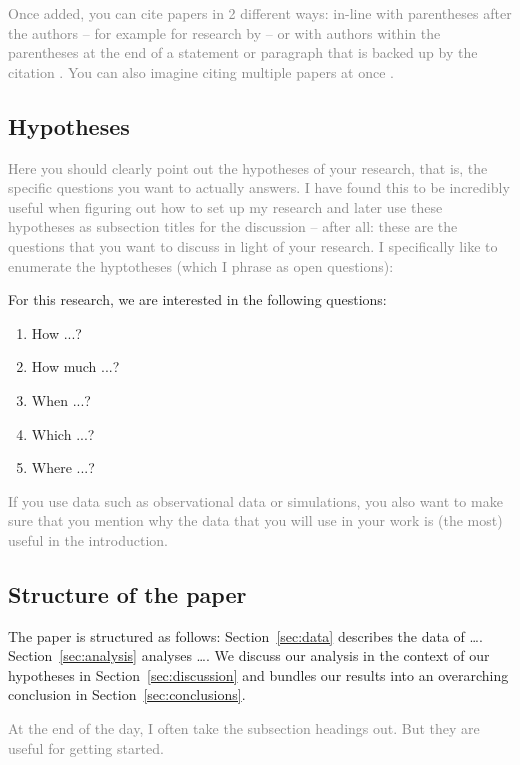 \documentclass[
  journal=pasa,
  manuscript=Research-Article,
  year=2025,
  volume=X,
]{cup-journal}
\newcommand{\comment}[1]{\textcolor{gray}{#1}}
\begin{document}
\comment{Once added, you can cite papers in 2 different ways: in-line with parentheses after the authors -- for example for research by \citet{Buder2024b} -- or with authors within the parentheses at the end of a statement or paragraph that is backed up by the citation \citep{Buder2024b}. You can also imagine citing multiple papers at once \citep[e.g.][]{Buder2018, Buder2019, Buder2021, Buder2022, Buder2024b}.}

\subsection{Hypotheses} \label{sec:hypotheses}

\comment{Here you should clearly point out the hypotheses of your research, that is, the specific questions you want to actually answers. I have found this to be incredibly useful when figuring out how to set up my research and later use these hypotheses as subsection titles for the discussion -- after all: these are the questions that you want to discuss in light of your research. I specifically like to enumerate the hyptotheses (which I phrase as open questions):}

For this research, we are interested in the following questions:
\begin{enumerate}
    \item How ...?
    \item How much ...?
    \item When ...?
    \item Which ...?
    \item Where ...?
\end{enumerate}

\comment{If you use data such as observational data or simulations, you also want to make sure that you mention why the data that you will use in your work is (the most) useful in the introduction.}

\subsection{Structure of the paper}

The paper is structured as follows: Section~\ref{sec:data} describes the data of \dots. Section~\ref{sec:analysis} analyses \dots. We discuss our analysis in the context of our hypotheses in Section~\ref{sec:discussion} and bundles our results into an overarching conclusion in Section~\ref{sec:conclusions}.

\comment{At the end of the day, I often take the subsection headings out. But they are useful for getting started.}
\end{document}
